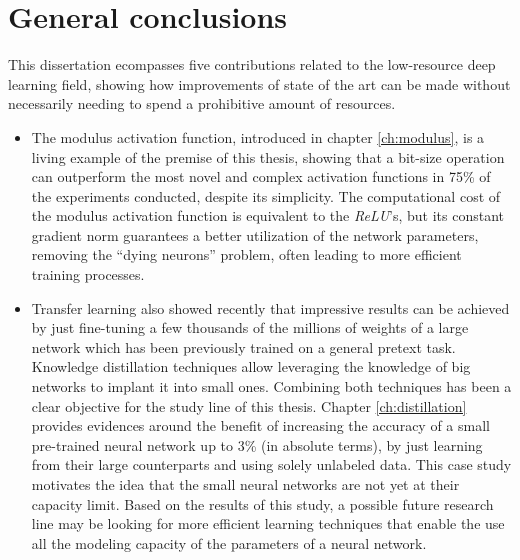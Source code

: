\chapter{General conclusions} \label{ch:conclusions}
This dissertation ecompasses five contributions related to the low-resource deep learning field, showing how improvements of state of the art can be made without necessarily needing to spend a prohibitive amount of resources. 

\begin{itemize}
\item The modulus activation function, introduced in chapter \ref{ch:modulus}, is a living example of the premise of this thesis, showing that a bit-size operation can outperform the most novel and complex activation functions in 75\% of the experiments conducted, despite its simplicity. The computational cost of the modulus activation function is equivalent to the \textit{ReLU}'s, but its constant gradient norm guarantees a better utilization of the network parameters, removing the ``dying neurons'' problem, often leading to more efficient training processes.

\item Transfer learning also showed recently that impressive results can be achieved by just fine-tuning a few thousands of the millions of weights of a large network which has been previously trained on a general pretext task. Knowledge distillation techniques allow leveraging the knowledge of big networks to implant it into small ones. Combining both techniques has been a clear objective for the study line of this thesis. Chapter \ref{ch:distillation} provides evidences around the benefit of increasing the accuracy of a small pre-trained neural network up to 3\% (in absolute terms), by just learning from their large counterparts and using solely unlabeled data. This case study motivates the idea that the small neural networks are not yet at their capacity limit. Based on the results of this study, a possible future research line may be looking for more efficient learning techniques that enable the use all the modeling capacity of the parameters of a neural network.


\end{itemize}
